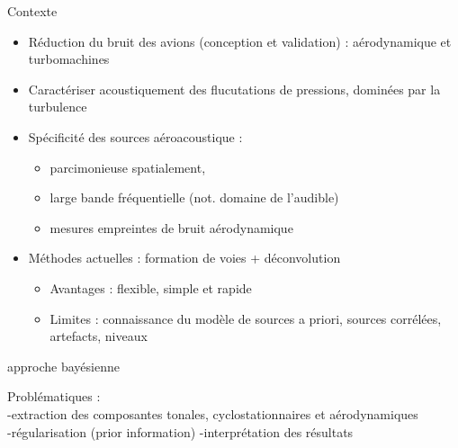 \begin{frame}{Contexte}
	\begin{itemize}
		\item Réduction du bruit des avions (conception et validation) : aérodynamique et turbomachines
		\item Caractériser acoustiquement des flucutations de pressions, dominées par la turbulence
		\item Spécificité des sources aéroacoustique : 
			\begin{itemize}
				\item parcimonieuse spatialement,
				\item large bande fréquentielle (not. domaine de l'audible)
				\item mesures empreintes de bruit aérodynamique
			\end{itemize}
		\item Méthodes actuelles : formation de voies + déconvolution
			\begin{itemize}
				\item Avantages : flexible, simple et rapide
				\item Limites : connaissance du modèle de sources a priori, sources corrélées, artefacts, niveaux
			\end{itemize}
	\end{itemize}
	
\end{frame}


\begin{frame}
	approche bayésienne
\end{frame}

\begin{frame}
	
	Problématiques : \\
	-extraction des composantes tonales, cyclostationnaires et aérodynamiques\\
	-régularisation (prior information)
	-interprétation des résultats
	

	
\end{frame}

